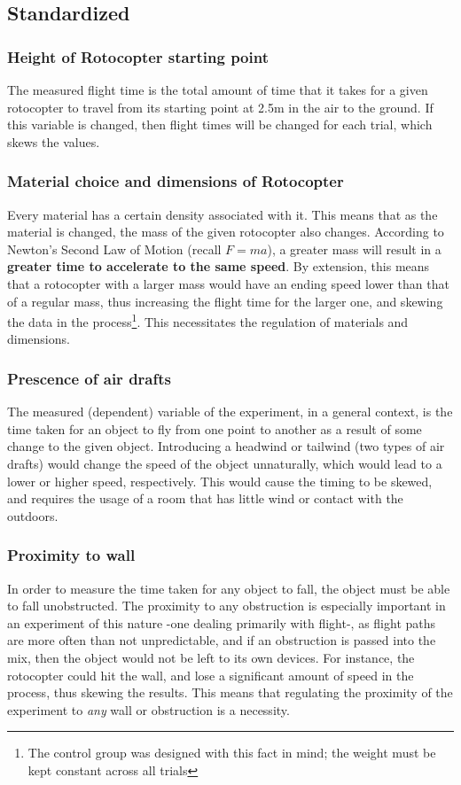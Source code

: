 \documentclass[]{article}
\theoremstyle{definition}
\begin{document}
\subsection{Standardized}

\subsubsection{Height of Rotocopter starting point}
The measured flight time is the total amount of time that it takes for a given rotocopter to travel from its starting point at 2.5m in the air to the ground. If this variable is changed, then flight times will be changed for each trial, which skews the values.

\subsubsection{Material choice and dimensions of Rotocopter}
Every material has a certain density associated with it. This means that as the material is changed, the mass of the given rotocopter also changes. According to Newton's Second Law of Motion (recall $F=ma$), a greater mass will result in a \textbf{greater time to accelerate to the same speed}. By extension, this means that a rotocopter with a larger mass would have an ending speed lower than that of a regular mass, thus increasing the flight time for the larger one, and skewing the data in the process\footnote{The control group was designed with this fact in mind; the weight must be kept constant across all trials}. This necessitates the regulation of materials and dimensions.

\subsubsection{Prescence of air drafts}
The measured (dependent) variable of the experiment, in a general context, is the time taken for an object to fly from one point to another as a result of some change to the given object. Introducing a headwind or tailwind (two types of air drafts) would change the speed of the object unnaturally, which would lead to a lower or higher speed, respectively. This would cause the timing to be skewed, and requires the usage of a room that has little wind or contact with the outdoors.

\subsubsection{Proximity to wall}
In order to measure the time taken for any object to fall, the object must be able to fall unobstructed. The proximity to any obstruction is especially important in an experiment of this nature -one dealing primarily with flight-, as flight paths are more often than not unpredictable, and if an obstruction is passed into the mix, then the object would not be left to its own devices. For instance, the rotocopter could hit the wall, and lose a significant amount of speed in the process, thus skewing the results. This means that regulating the proximity of the experiment to \textit{any} wall or obstruction is a necessity.
\end{document}
